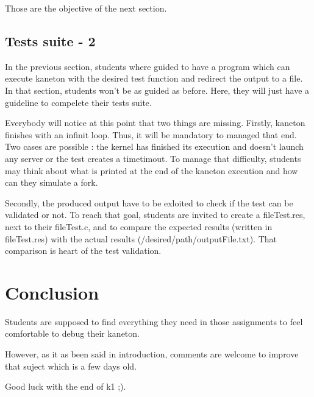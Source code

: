 Those are the objective of the next section.

\section{Tests suite - 2}
In the previous section, students where guided to have a program which can execute kaneton with the desired test function and redirect the output to a file. In that section, students won't be as guided as before. Here, they will just have a guideline to compelete their tests suite.


Everybody will notice at this point that two things are missing. Firstly, kaneton finishes with an infinit loop. Thus, it will be mandatory to managed that end. Two cases are possible : the kernel has finished its execution and doesn't launch any server or the test creates a timetimout. To manage that difficulty, students may think about what is printed at the end of the kaneton execution and how can they simulate a fork.

Secondly, the produced output have to be exloited to check if the test can be validated or not. To reach that goal, students are invited to create a fileTest.res, next to their fileTest.c, and to compare the expected results (written in fileTest.res) with the actual results (/desired/path/outputFile.txt). That comparison is heart of the test validation.

\chapter{Conclusion}
Students are supposed to find everything they need in those assignments to feel comfortable to debug their kaneton.

However, as it as been said in introduction, comments are welcome to improve that suject which is a few days old.

Good luck with the end of k1 ;).




